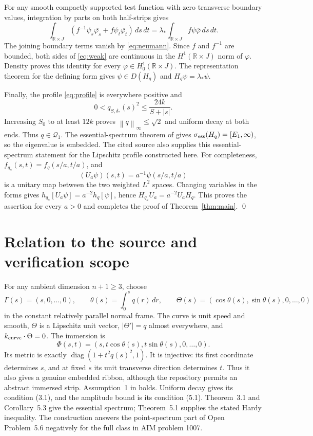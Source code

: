 \documentclass[11pt,a4paper]{article}
\newcommand{\R}{\mathbb R}
\newcommand{\norm}[1]{\left\lVert#1\right\rVert}
\newcommand{\mathscr}{\mathcal}
\begin{document}
For any smooth compactly supported test function with zero transverse
boundary values, integration by parts on both half-strips gives
\begin{equation}\label{eq:weak}
 \int_{\R\times J}
 \left(f^{-1}\psi_s\overline{\varphi_s}
                  +f\psi_t\overline{\varphi_t}\right)\,ds\,dt
 =\lambda_*\int_{\R\times J}f\psi\overline\varphi\,ds\,dt.
\end{equation}
The joining boundary terms vanish by \eqref{eq:neumann}.
Since $f$ and $f^{-1}$ are bounded, both sides of \eqref{eq:weak}
are continuous in the $H^1(\R\times J)$ norm of $\varphi$.
Density proves this identity for every $\varphi\in H_0^1(\R\times J)$.
The representation theorem for the defining form gives
$\psi\in D(H_q)$ and $H_q\psi=\lambda_*\psi$.

Finally, the profile \eqref{eq:profile} is everywhere positive and
\[
 0<q_{S,\delta_*}(s)^2\le\frac{24k}{S+|s|}.
\]
Increasing $S_0$ to at least $12k$ proves $\norm q_\infty\le\sqrt2$
and uniform decay at both ends. Thus $q\in\mathscr Q_1$.
The essential-spectrum theorem of \cite[Theorem~3.1]{KZ} gives
$\sigma_{\rm ess}(H_q)=[E_1,\infty)$, so the eigenvalue is embedded.
The cited source also supplies this essential-spectrum statement for
the Lipschitz profile constructed here. For completeness, $f_{q_a}(s,t)=f_q(s/a,t/a)$, and
\[
 (U_a\psi)(s,t)=a^{-1}\psi(s/a,t/a)
\]
is a unitary map between the two weighted $L^2$ spaces.
Changing variables in the forms gives
$h_{q_a}[U_a\psi]=a^{-2}h_q[\psi]$, hence
$H_{q_a}U_a=a^{-2}U_aH_q$. This proves the assertion
for every $a>0$ and completes the proof of Theorem~\ref{thm:main}.
\qed

\clearpage
\section*{Relation to the source and verification scope}

For any ambient dimension $n+1\ge3$, choose
\[
 \Gamma(s)=(s,0,\ldots,0),\qquad
 \theta(s)=\int_0^s q(r)\,dr,\qquad
 \Theta(s)=(\cos\theta(s),\sin\theta(s),0,\ldots,0)
\]
in the constant relatively parallel normal frame. The curve is unit speed
and smooth, $\Theta$ is a Lipschitz unit vector,
$|\Theta'|=q$ almost everywhere, and
$k_{\rm curve}\cdot\Theta=0$. The immersion is
\[
 \Phi(s,t)=(s,t\cos\theta(s),t\sin\theta(s),0,\ldots,0).
\]
Its metric is exactly $\operatorname{diag}(1+t^2q(s)^2,1)$.
It is injective: its first coordinate determines $s$, and at fixed $s$
its unit transverse direction determines $t$. Thus it also gives a
genuine embedded ribbon, although the repository permits an abstract
immersed strip. Assumption~1 in \cite{KZ} holds.
Uniform decay gives its condition (3.1), and the amplitude bound is
its condition (5.1). Theorem~3.1 and Corollary~5.3 give the essential
spectrum; Theorem~5.1 supplies the stated Hardy inequality.
The construction answers the point-spectrum part of Open Problem~5.6
negatively for the full class in AIM problem 1007.
\end{document}
